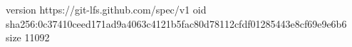 version https://git-lfs.github.com/spec/v1
oid sha256:0c37410ceed171ad9a4063c4121b5fac80d78112cfdf01285443e8cf69e9e6b6
size 11092
